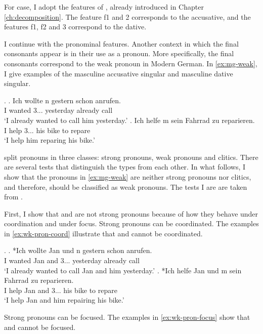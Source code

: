 For case, I adopt the features of \citet{caha2009}, already introduced in Chapter \ref{ch:decomposition}. The feature \ac{f}1 and 2 corresponds to the accusative, and the features \ac{f}1, \ac{f}2 and 3 correspond to the dative.

I continue with the pronominal features. Another context in which the final consonants appear is in their use as a pronoun. More specifically, the final consonants correspond to the weak pronoun in Modern German. In \ref{ex:mg-weak}, I give examples of the masculine accusative singular and masculine dative singular.

\ex.\label{ex:mg-weak}
\ag. Ich wollte n gestern schon anrufen.\\
 I wanted 3... yesterday already call\\
 `I already wanted to call him yesterday.'
\bg. Ich helfe m sein Fahrrad zu reparieren.\\
 I help 3... his bike to repare\\
 `I help him reparing his bike.'

\citet{cardinaletti1994} split pronouns in three classes: strong pronouns, weak pronouns and clitics. There are several tests that distinguish the types from each other. In what follows, I show that the pronouns in \ref{ex:mg-weak} are neither strong pronouns nor clitics, and therefore, should be classified as weak pronouns. The tests I are are taken from \citet{cardinaletti1994}.

First, I show that  and  are not strong pronouns because of how they behave under coordination and under focus.
Strong pronouns can be coordinated. The examples in \ref{ex:wk-pron-coord} illustrate that  and  cannot be coordinated.

\ex.\label{ex:wk-pron-coord}
\ag. *Ich wollte Jan und n gestern schon anrufen.\\
 I wanted Jan and 3... yesterday already call\\
 `I already wanted to call Jan and him yesterday.'
\bg. *Ich helfe Jan und m sein Fahrrad zu reparieren.\\
 I help Jan and 3... his bike to repare\\
 `I help Jan and him repairing his bike.'

Strong pronouns can be focused.
The examples in \ref{ex:wk-pron-focus} show that  and  cannot be focused.

